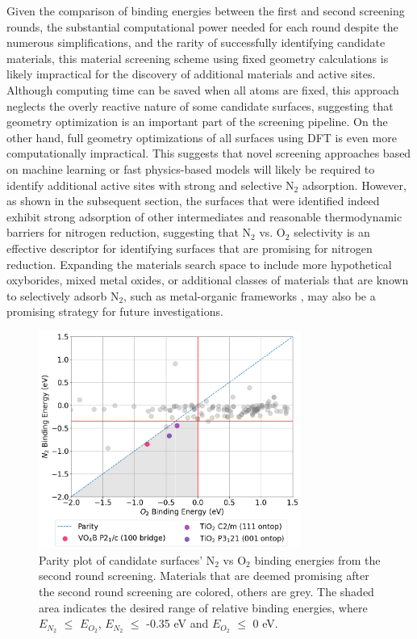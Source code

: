 Given the comparison of binding energies between the first and second screening rounds, the substantial computational power needed for each round despite the numerous simplifications, and the rarity of successfully identifying candidate materials, this material screening scheme using fixed geometry calculations is likely impractical for the discovery of additional materials and active sites. Although computing time can be saved when all atoms are fixed, this approach neglects the overly reactive nature of some candidate surfaces, suggesting that geometry optimization is an important part of the screening pipeline. On the other hand, full geometry optimizations of all surfaces using DFT is even more computationally impractical. This suggests that novel screening approaches based on machine learning or fast physics-based models will likely be required to identify additional active sites with strong and selective N$_2$ adsorption. However, as shown in the subsequent section, the surfaces that were identified indeed exhibit strong adsorption of other intermediates and reasonable thermodynamic barriers for nitrogen reduction, suggesting that N$_2$ vs. O$_2$ selectivity is an effective descriptor for identifying surfaces that are promising for nitrogen reduction. Expanding the materials search space to include more hypothetical oxyborides, mixed metal oxides, or additional classes of materials that are known to selectively adsorb N$_2$, such as metal-organic frameworks \cite{Han2023MetalOrganicAmmonia, Khalil2021TheFeatures, Han2023REVIEWReduction}, may also be a promising strategy for future investigations.

\begin{figure}[h]
\centering
\includegraphics[width=8.6cm]{figures/metal_oxide_figures/Figure 4.png}

\caption{Parity plot of candidate surfaces' N$_2$ vs O$_2$ binding energies from the second round screening. Materials that are deemed promising after the second round screening are colored, others are grey. The shaded area indicates the desired range of relative binding energies, where $E_{N_2}$ $\le$ $E_{O_2}$, $E_{N_2}$ $\le$ -0.35 eV and $E_{O_2}$ $\le$ 0 eV. }
\label{fig:high_fidelity_screening_-0.3}
\end{figure}

